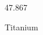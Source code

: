 \documentclass[12pt]{article}
\begin{document}
\hfill{}
\vfill
\begin{center}
  {\fontsize{50}{60}
  }

  \vspace{1em}

  47.867

Titanium
\end{center}
\vfill
\end{document}

